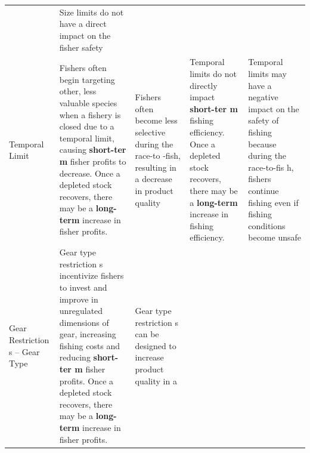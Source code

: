 \documentclass[]{book}
\begin{document}
\begin{longtable}[]{@{}lllll@{}}
\begin{minipage}[t]{0.17\columnwidth}
\end{minipage} & \begin{minipage}[t]{0.17\columnwidth}\raggedright\strut
Size limits do not have a direct impact on the fisher safety\strut
\end{minipage}\tabularnewline
\begin{minipage}[t]{0.17\columnwidth}\raggedright\strut
Temporal Limit\strut
\end{minipage} & \begin{minipage}[t]{0.17\columnwidth}\raggedright\strut
Fishers often begin targeting other, less valuable species when a
fishery is closed due to a temporal limit, causing \textbf{short-ter m}
fisher profits to decrease. Once a depleted stock recovers, there may be
a \textbf{long-term } increase in fisher profits.\strut
\end{minipage} & \begin{minipage}[t]{0.17\columnwidth}\raggedright\strut
Fishers often become less selective during the race-to -fish, resulting
in a decrease in product quality\strut
\end{minipage} & \begin{minipage}[t]{0.17\columnwidth}\raggedright\strut
Temporal limits do not directly impact \textbf{short-ter m} fishing
efficiency. Once a depleted stock recovers, there may be a
\textbf{long-term } increase in fishing efficiency.\strut
\end{minipage} & \begin{minipage}[t]{0.17\columnwidth}\raggedright\strut
Temporal limits may have a negative impact on the safety of fishing
because during the race-to-fis h, fishers continue fishing even if
fishing conditions become unsafe\strut
\end{minipage}\tabularnewline
\begin{minipage}[t]{0.17\columnwidth}\raggedright\strut
Gear Restriction s -- Gear Type\strut
\end{minipage} & \begin{minipage}[t]{0.17\columnwidth}\raggedright\strut
Gear type restriction s incentivize fishers to invest and improve in
unregulated dimensions of gear, increasing fishing costs and reducing
\textbf{short-ter m} fisher profits. Once a depleted stock recovers,
there may be a \textbf{long-term } increase in fisher profits.\strut
\end{minipage} & \begin{minipage}[t]{0.17\columnwidth}\raggedright\strut
Gear type restriction s can be designed to increase product quality in a

\end{minipage}
\end{longtable}
\end{document}
